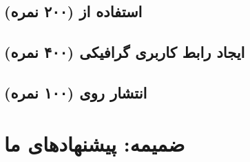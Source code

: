 \documentclass[a4paper]{report}
\begin{document}
\section{استفاده از  (۲۰۰ نمره)}


\section{ایجاد رابط کاربری گرافیکی (۴۰۰ نمره)}


\section{انتشار روی  (۱۰۰ نمره)}


\chapter{ضمیمه: پیشنهادهای ما}

\end{document}
